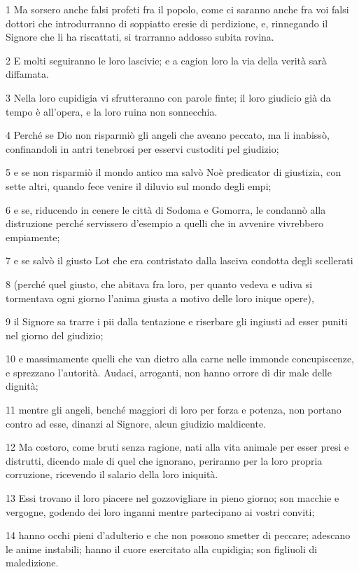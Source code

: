 \par 1 Ma sorsero anche falsi profeti fra il popolo, come ci saranno anche fra voi falsi dottori che introdurranno di soppiatto eresie di perdizione, e, rinnegando il Signore che li ha riscattati, si trarranno addosso subita rovina.
\par 2 E molti seguiranno le loro lascivie; e a cagion loro la via della verità sarà diffamata.
\par 3 Nella loro cupidigia vi sfrutteranno con parole finte; il loro giudicio già da tempo è all'opera, e la loro ruina non sonnecchia.
\par 4 Perché se Dio non risparmiò gli angeli che aveano peccato, ma li inabissò, confinandoli in antri tenebrosi per esservi custoditi pel giudizio;
\par 5 e se non risparmiò il mondo antico ma salvò Noè predicator di giustizia, con sette altri, quando fece venire il diluvio sul mondo degli empi;
\par 6 e se, riducendo in cenere le città di Sodoma e Gomorra, le condannò alla distruzione perché servissero d'esempio a quelli che in avvenire vivrebbero empiamente;
\par 7 e se salvò il giusto Lot che era contristato dalla lasciva condotta degli scellerati
\par 8 (perché quel giusto, che abitava fra loro, per quanto vedeva e udiva si tormentava ogni giorno l'anima giusta a motivo delle loro inique opere),
\par 9 il Signore sa trarre i pii dalla tentazione e riserbare gli ingiusti ad esser puniti nel giorno del giudizio;
\par 10 e massimamente quelli che van dietro alla carne nelle immonde concupiscenze, e sprezzano l'autorità. Audaci, arroganti, non hanno orrore di dir male delle dignità;
\par 11 mentre gli angeli, benché maggiori di loro per forza e potenza, non portano contro ad esse, dinanzi al Signore, alcun giudizio maldicente.
\par 12 Ma costoro, come bruti senza ragione, nati alla vita animale per esser presi e distrutti, dicendo male di quel che ignorano, periranno per la loro propria corruzione, ricevendo il salario della loro iniquità.
\par 13 Essi trovano il loro piacere nel gozzovigliare in pieno giorno; son macchie e vergogne, godendo dei loro inganni mentre partecipano ai vostri conviti;
\par 14 hanno occhi pieni d'adulterio e che non possono smetter di peccare; adescano le anime instabili; hanno il cuore esercitato alla cupidigia; son figliuoli di maledizione.
